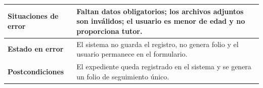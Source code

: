 \begin{longtable}{|p{3.5cm}|p{2cm}|p{2.5cm}|p{7cm}|}
\textbf{Situaciones de error} & \multicolumn{3}{p{11.5cm}|}{Faltan datos obligatorios; los archivos adjuntos son inválidos; el usuario es menor de edad y no proporciona tutor.} \\ \hline
\textbf{Estado en error} & \multicolumn{3}{p{11.5cm}|}{El sistema no guarda el registro, no genera folio y el usuario permanece en el formulario.} \\ \hline
\textbf{Postcondiciones} & \multicolumn{3}{p{11.5cm}|}{El expediente queda registrado en el sistema y se genera un folio de seguimiento único.} \\ \hline
\end{longtable}
\endgroup

\vspace{0.8cm}

\begingroup
\setlength{\parskip}{0pt}
